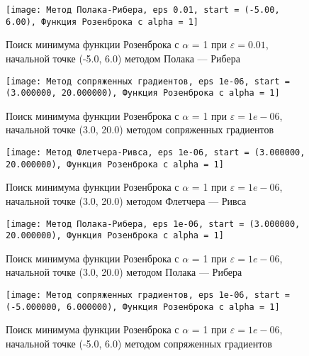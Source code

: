             \begin{figure}[H]
	        \centering
	        \texttt{[image: Метод Полака-Рибера, eps 0.01, start = (-5.00, 6.00), Функция Розенброка с alpha = 1]}%
	        \caption{Поиск минимума функции Розенброка с $\alpha$ = 1 при $\varepsilon = 0.01$, начальной точке (-5.0, 6.0) методом Полака --- Рибера}
	        \vspace*{-1.2cm}
            \end{figure}
            
            \begin{figure}[H]
	        \centering
	        \texttt{[image: Метод сопряженных градиентов, eps 1e-06, start = (3.000000, 20.000000), Функция Розенброка с alpha = 1]}%
	        \caption{Поиск минимума функции Розенброка с $\alpha$ = 1 при $\varepsilon = 1e-06$, начальной точке (3.0, 20.0) методом сопряженных градиентов}
	        \vspace*{-1.2cm}
            \end{figure}
            
            \begin{figure}[H]
	        \centering
	        \texttt{[image: Метод Флетчера-Ривса, eps 1e-06, start = (3.000000, 20.000000), Функция Розенброка с alpha = 1]}%
	        \caption{Поиск минимума функции Розенброка с $\alpha$ = 1 при $\varepsilon = 1e-06$, начальной точке (3.0, 20.0) методом Флетчера --- Ривса}
	        \vspace*{-1.2cm}
            \end{figure}
            
            \begin{figure}[H]
	        \centering
	        \texttt{[image: Метод Полака-Рибера, eps 1e-06, start = (3.000000, 20.000000), Функция Розенброка с alpha = 1]}%
	        \caption{Поиск минимума функции Розенброка с $\alpha$ = 1 при $\varepsilon = 1e-06$, начальной точке (3.0, 20.0) методом Полака --- Рибера}
	        \vspace*{-1.2cm}
            \end{figure}
            
            \begin{figure}[H]
	        \centering
	        \texttt{[image: Метод сопряженных градиентов, eps 1e-06, start = (-5.000000, 6.000000), Функция Розенброка с alpha = 1]}%
	        \caption{Поиск минимума функции Розенброка с $\alpha$ = 1 при $\varepsilon = 1e-06$, начальной точке (-5.0, 6.0) методом сопряженных градиентов}
	        \vspace*{-1.2cm}
            \end{figure}
            
